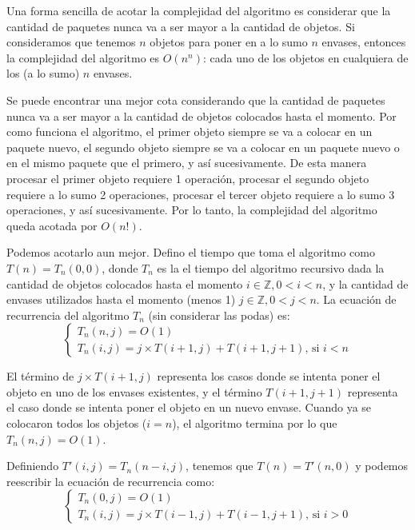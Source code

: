 \documentclass[11pt]{article}
\begin{document}
Una forma sencilla de acotar la complejidad del algoritmo es considerar
que la cantidad de paquetes nunca va a ser mayor a la cantidad de
objetos. Si consideramos que tenemos \(n\) objetos para poner en a lo
sumo \(n\) envases, entonces la complejidad del algoritmo es \(O(n^n)\):
cada uno de los objetos en cualquiera de los (a lo sumo) \(n\) envases.

Se puede encontrar una mejor cota considerando que la cantidad de
paquetes nunca va a ser mayor a la cantidad de objetos colocados hasta
el momento. Por como funciona el algoritmo, el primer objeto siempre se
va a colocar en un paquete nuevo, el segundo objeto siempre se va a
colocar en un paquete nuevo o en el mismo paquete que el primero, y así
sucesivamente. De esta manera procesar el primer objeto requiere 1
operación, procesar el segundo objeto requiere a lo sumo 2 operaciones,
procesar el tercer objeto requiere a lo sumo 3 operaciones, y así
sucesivamente. Por lo tanto, la complejidad del algoritmo queda acotada
por \(O(n!)\).

Podemos acotarlo aun mejor. Defino el tiempo que toma el algoritmo como
\(T(n) = T_n(0, 0)\), donde \(T_n\) es la el tiempo del algoritmo
recursivo dada la cantidad de objetos colocados hasta el momento
\(i\in \mathbb{Z}, 0 < i < n\), y la cantidad de envases utilizados
hasta el momento (menos 1) \(j \in \mathbb{Z}, 0 < j < n\). La ecuación
de recurrencia del algoritmo \(T_n\) (sin considerar las podas) es: \[
\left\{
    \begin{array}{ll}
        T_n(n, j) = O(1) \\
        T_n(i, j) = j \times T(i + 1, j) + T(i + 1, j + 1) \text{, si } i < n
    \end{array}
\right.
\]

El término de \(j \times T(i + 1, j)\) representa los casos donde se
intenta poner el objeto en uno de los envases existentes, y el término
\(T(i + 1, j + 1)\) representa el caso donde se intenta poner el objeto
en un nuevo envase. Cuando ya se colocaron todos los objetos
(\(i = n\)), el algoritmo termina por lo que \(T_n(n, j) = O(1)\).

Definiendo \(T'(i, j) = T_n(n-i, j)\), tenemos que \(T(n) = T'(n, 0)\) y
podemos reescribir la ecuación de recurrencia como: \[
\left\{
    \begin{array}{ll}
        T_n(0, j) = O(1) \\
        T_n(i, j) = j \times T(i - 1, j) + T(i - 1, j + 1) \text{, si } i > 0
    \end{array}
\right.
\]
\end{document}
